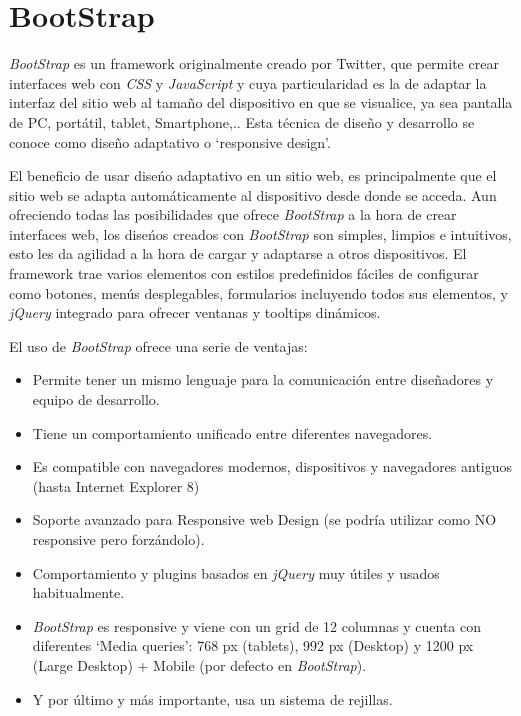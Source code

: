 \documentclass[a4paper, 12pt]{book}
\begin{document}
\section{BootStrap}
\label{sec:bootstrap}
\textit{BootStrap} es un framework originalmente creado por Twitter, que permite crear interfaces web con \textit{CSS} y \textit{JavaScript} y cuya 
particularidad es la de adaptar la interfaz del sitio web al tama\~no del dispositivo en que se visualice, ya sea pantalla de PC, port\'atil, tablet, 
Smartphone,.. Esta t\'ecnica de dise\~no y desarrollo se conoce como dise\~no adaptativo o `responsive design'.

El beneficio de usar dise\'no adaptativo en un sitio web, es principalmente que el sitio web se adapta autom\'aticamente al dispositivo desde donde 
se acceda. Aun ofreciendo todas las posibilidades que ofrece \textit{BootStrap} a la hora de crear interfaces web, los dise\'nos creados con \textit{BootStrap} son 
simples, limpios e intuitivos, esto les da agilidad a la hora de cargar y adaptarse a otros dispositivos. El framework trae varios elementos con 
estilos predefinidos f\'aciles de configurar como botones, men\'us desplegables, formularios incluyendo todos sus elementos, y \textit{jQuery} integrado para 
ofrecer ventanas y tooltips din\'amicos.

El uso de \textit{BootStrap} ofrece una serie de ventajas:
\begin{itemize}
  \item Permite tener un mismo lenguaje para la comunicaci\'on entre dise\~nadores y equipo de desarrollo.
  \item Tiene un comportamiento unificado entre diferentes navegadores.
  \item Es compatible con navegadores modernos, dispositivos y navegadores antiguos (hasta Internet Explorer 8)
  \item Soporte avanzado para Responsive web Design (se podr\'ia utilizar como NO responsive pero forz\'andolo).
  \item Comportamiento y plugins basados en \textit{jQuery} muy \'utiles y usados habitualmente.
  \item \textit{BootStrap} es responsive y viene con un grid de 12 columnas y cuenta con diferentes `Media queries': 768 px (tablets), 992 px (Desktop) y 
  1200 px (Large Desktop) + Mobile (por defecto en \textit{BootStrap}).
  \item Y por \'ultimo y m\'as importante, usa un sistema de rejillas.
\end{itemize}
\end{document}
